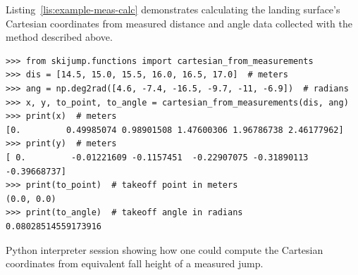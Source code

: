 \documentclass[smallextended]{svjour3}       %
\begin{document}
Listing~\ref{lis:example-meas-calc} demonstrates calculating the landing
surface's Cartesian coordinates from measured distance and angle data collected
with the method described above.
%
\begin{listing*}
  \begin{verbatim}
>>> from skijump.functions import cartesian_from_measurements
>>> dis = [14.5, 15.0, 15.5, 16.0, 16.5, 17.0]  # meters
>>> ang = np.deg2rad([4.6, -7.4, -16.5, -9.7, -11, -6.9])  # radians
>>> x, y, to_point, to_angle = cartesian_from_measurements(dis, ang)
>>> print(x)  # meters
[0.         0.49985074 0.98901508 1.47600306 1.96786738 2.46177962]
>>> print(y)  # meters
[ 0.         -0.01221609 -0.1157451  -0.22907075 -0.31890113 -0.39668737]
>>> print(to_point)  # takeoff point in meters
(0.0, 0.0)
>>> print(to_angle)  # takeoff angle in radians
0.08028514559173916
  \end{verbatim}
  \caption{Python interpreter session showing how one could compute the
  Cartesian coordinates from equivalent fall height of a measured jump.}
  \label{lis:example-meas-calc}
\end{listing*}
\end{document}
